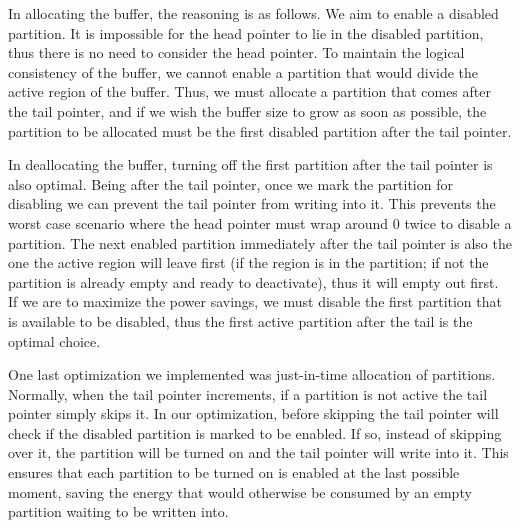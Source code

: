 In allocating the buffer, the reasoning is as follows. We aim to enable a disabled partition. It is impossible for the head pointer to lie in the disabled partition, thus there is no need to consider the head pointer. To maintain the logical consistency of the buffer, we cannot enable a partition that would divide the active region of the buffer. Thus, we must allocate a partition that comes after the tail pointer, and if we wish the buffer size to grow as soon as possible, the partition to be allocated must be the first disabled partition after the tail pointer.

In deallocating the buffer, turning off the first partition after the tail pointer is also optimal. Being after the tail pointer, once we mark the partition for disabling we can prevent the tail pointer from writing into it. This prevents the worst case scenario where the head pointer must wrap around 0 twice to disable a partition. The next enabled partition immediately after the tail pointer is also the one the active region will leave first (if the region is in the partition; if not the partition is already empty and ready to deactivate), thus it will empty out first. If we are to maximize the power savings, we must disable the first partition that is available to be disabled, thus the first active partition after the tail is the optimal choice.

One last optimization we implemented was just-in-time allocation of partitions. Normally, when the tail pointer increments, if a partition is not active the tail pointer simply skips it. In our optimization, before skipping the tail pointer will check if the disabled partition is marked to be enabled. If so, instead of skipping over it, the partition will be turned on and the tail pointer will write into it. This ensures that each partition to be turned on is enabled at the last possible moment, saving the energy that would otherwise be consumed by an empty partition waiting to be written into.

